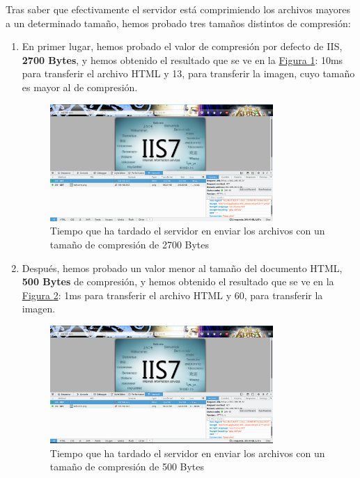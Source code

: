 \documentclass[10pt,a4paper,spanish]{article}
\numberwithin{equation}{section} %
\numberwithin{figure}{section} %
\numberwithin{table}{section} %
\begin{document}
Tras saber que efectivamente el servidor está comprimiendo los archivos mayores a un determinado tamaño, hemos probado tres tamaños distintos de compresión:
\begin{enumerate}[$\bullet$]
    \item En primer lugar, hemos probado el valor de compresión por defecto de IIS, \textbf{2700 Bytes}, y hemos obtenido el resultado que se ve en la \hyperref[compr1]{Figura \ref*{compr1}}: 10ms para transferir el archivo HTML y 13, para transferir la imagen, cuyo tamaño es mayor al de compresión.

    \begin{figure}[!h]
        \centering
        \includegraphics[width=0.8\textwidth]{23}
        \caption{Tiempo que ha tardado el servidor en enviar los archivos con un tamaño de compresión de 2700 Bytes}
        \label{compr1}
    \end{figure}

    \item Después, hemos probado un valor menor al tamaño del documento HTML, \textbf{500 Bytes} de compresión, y hemos obtenido el resultado que se ve en la \hyperref[compr2]{Figura \ref*{compr2}}: 1ms para transferir el archivo HTML y 60, para transferir la imagen.

    \begin{figure}[!h]
        \centering
        \includegraphics[width=0.8\textwidth]{24}
        \caption{Tiempo que ha tardado el servidor en enviar los archivos con un tamaño de compresión de 500 Bytes}
        \label{compr2}
    \end{figure}


\end{enumerate}
\end{document}
